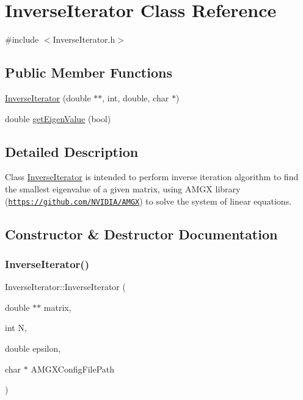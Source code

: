 \hypertarget{classInverseIterator}{}\section{Inverse\+Iterator Class Reference}
\label{classInverseIterator}


{\ttfamily \#include $<$Inverse\+Iterator.\+h$>$}

\subsection*{Public Member Functions}
\begin{DoxyCompactItemize}
\item 
\hyperlink{classInverseIterator_ae93b4bde7555481fe252bb9b35953c22}{Inverse\+Iterator} (double $\ast$$\ast$, int, double, char $\ast$)
\item 
double \hyperlink{classInverseIterator_afa15c1c69a14e4d222557ea9fb8007b8}{get\+Eigen\+Value} (bool)
\end{DoxyCompactItemize}


\subsection{Detailed Description}
Class \hyperlink{classInverseIterator}{Inverse\+Iterator} is intended to perform inverse iteration algorithm to find the smallest eigenvalue of a given matrix, using A\+M\+GX library (\href{https://github.com/NVIDIA/AMGX}{\tt https\+://github.\+com/\+N\+V\+I\+D\+I\+A/\+A\+M\+GX}) to solve the system of linear equations. 

\subsection{Constructor \& Destructor Documentation}
\mbox{\label{classInverseIterator_ae93b4bde7555481fe252bb9b35953c22}} 
\subsubsection{\texorpdfstring{Inverse\+Iterator()}{InverseIterator()}}
{\footnotesize\ttfamily Inverse\+Iterator\+::\+Inverse\+Iterator (\begin{DoxyParamCaption}\item[{double $\ast$$\ast$}]{matrix,  }\item[{int}]{N,  }\item[{double}]{epsilon,  }\item[{char $\ast$}]{A\+M\+G\+X\+Config\+File\+Path }\end{DoxyParamCaption})}

